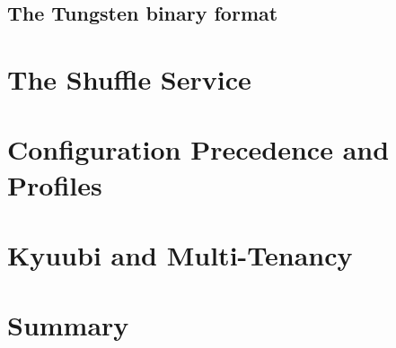 \subsection{The Tungsten binary format}
\tbd

\section{The Shuffle Service}
\label{sec:tune-shuffle-service}
\tbd

\section{Configuration Precedence and Profiles}
\label{sec:tune-config}
\tbd

\section{Kyuubi and Multi-Tenancy}
\label{sec:tune-kyuubi}
\tbd

\section{Summary}
\tbd

